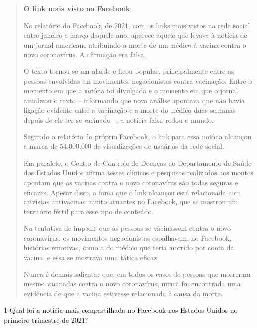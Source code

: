 \begin{quote}
\textbf{O link mais visto no Facebook}

No relatório do Facebook, de 2021, com os links mais vistos na rede social
entre janeiro e março daquele ano, aparece aquele que levava à notícia
de um jornal americano atribuindo a morte de um médico à vacina contra
o novo coronavírus. A afirmação era falsa.

O texto tornou-se um alarde e ficou popular, principalmente entre as pessoas
envolvidas em movimentos negacionistas contra vacinação. Entre o momento em
que a notícia foi divulgada e o momento em que o jornal atualizou o texto –
informando que nova análise apontava que não havia ligação evidente entre a
vacinação e a morte do médico duas semanas depois de ele ter se vacinado –,
a notícia falsa rodou o mundo.

Segundo o relatório do próprio Facebook, o link para essa notícia alcançou
a marca de 54.000.000 de visualizações de usuários da rede social.

Em paralelo, o Centro de Controle de Doenças do Departamento de Saúde dos Estados
Unidos afirma testes clínicos e pesquisas realizados aos montes apontam que as
vacinas contra o novo coronavírus são todas seguras e eficazes. Apesar disso, a
fama que o link alcançou está relacionada com ativistas antivacinas, muito atuantes
no Facebook, que se mostrou um território fértil para esse tipo de conteúdo.

Na tentativa de impedir que as pessoas se vacinassem contra o novo coronavírus,
os movimentos negacionistas espalhavam, no Facebook, histórias emotivas, como
a do médico que teria morrido por conta da vacina, e essa se mostrava uma
tática eficaz.

Nunca é demais salientar que, em todos os casos de pessoas que morreram
mesmo vacinadas contra o novo coronavírus, nunca foi encontrada uma evidência
de que a vacina estivesse relacionada à causa da morte.

\end{quote}


\num{1} Qual foi a notícia mais compartilhada no Facebook nos Estados
Unidos no primeiro trimestre de 2021?



